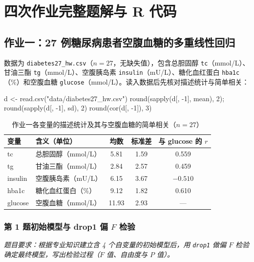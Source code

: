 \section{四次作业完整题解与 R 代码}

\subsection{作业一：27 例糖尿病患者空腹血糖的多重线性回归}

数据为 \texttt{diabetes27\_hw.csv}（$n=27$，无缺失值），包含总胆固醇 \texttt{tc}（mmol/L）、甘油三酯 \texttt{tg}（mmol/L）、空腹胰岛素 \texttt{insulin}（mU/L）、糖化血红蛋白 \texttt{hba1c}（\%）和空腹血糖 \texttt{glucose}（mmol/L）。读入数据后先核对描述统计与简单相关：

\begin{RCode}
d <- read.csv("data/diabetes27_hw.csv")
round(sapply(d[, -1], mean), 2); round(sapply(d[, -1], sd), 2)
round(cor(d[, -1]), 3)
\end{RCode}

\begin{table}[htbp]
\centering\small
\caption{作业一各变量的描述统计及其与空腹血糖的简单相关（$n=27$）}
\begin{tabular}{@{}llccc@{}}
\toprule
变量 & 含义（单位） & 均数 & 标准差 & 与 glucose 的 $r$\\
\midrule
tc      & 总胆固醇（mmol/L） & 5.81  & 1.59 & 0.559\\
tg      & 甘油三酯（mmol/L） & 2.84  & 2.57 & 0.459\\
insulin & 空腹胰岛素（mU/L） & 6.15  & 3.67 & $-0.510$\\
hba1c   & 糖化血红蛋白（\%） & 9.12  & 1.82 & 0.610\\
glucose & 空腹血糖（mmol/L） & 11.93 & 2.93 & ---\\
\bottomrule
\end{tabular}
\end{table}

\subsubsection*{第 1 题\quad 初始模型与 drop1 偏 $F$ 检验}
\emph{题目要求：根据专业知识建立含 4 个自变量的初始模型后，用 \texttt{drop1} 做偏 $F$ 检验确定最终模型，写出检验过程（$F$ 值、自由度与 $P$ 值）。}

